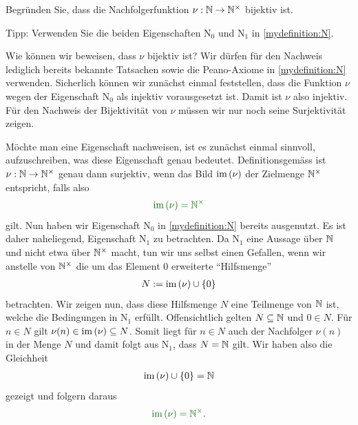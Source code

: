 \begin{mychallenge}\label{mychallenge:0107}
	Begründen Sie, dass die Nachfolgerfunktion $\nu:\mathbb{N}\to\mathbb{N}^{\times}$ bijektiv ist.

	\noindent
	Tipp: Verwenden Sie die beiden Eigenschaften N$_0$ und N$_1$ in \cref{mydefinition:N}.
	\begin{myanswer}
		Wie können wir beweisen, dass $\nu$ bijektiv ist?
		Wir dürfen für den Nachweis lediglich bereits bekannte Tatsachen sowie die Peano-Axiome in \cref{mydefinition:N} verwenden.
		Sicherlich können wir zunächst einmal feststellen, dass die Funktion $\nu$ wegen der Eigenschaft N$_0$ als injektiv vorausgesetzt ist.
		Damit ist $\nu$ also injektiv. Für den Nachweis der Bijektivität von $\nu$ müssen wir nur noch seine Surjektivität zeigen.

		Möchte man eine Eigenschaft nachweisen, ist es zunächst einmal sinnvoll, aufzuschreiben, was diese Eigenschaft genau bedeutet.
		Definitionsgemäss ist $\nu:\mathbb{N}\to\mathbb{N}^{\times}$ genau dann surjektiv, wenn das Bild $\text{im}\left(\nu\right)$ der Zielmenge $\mathbb{N}^{\times}$ entspricht, falls also
		\begin{align*}
			\textcolor{DarkGreen}{\text{im}\lr{\nu} = \Nunit}
		\end{align*}
		gilt.
		Nun haben wir Eigenschaft N$_0$ in \cref{mydefinition:N} bereits ausgenutzt.
		Es ist daher naheliegend, Eigenschaft N$_1$ zu betrachten.
		Da N$_1$ eine Aussage über $\mathbb{N}$ und nicht etwa über $\mathbb{N}^{\times}$ macht,
		tun wir uns selbst einen Gefallen, wenn wir anstelle von $\mathbb{N}^{\times}$ die um das Element $0$ erweiterte \enquote{Hilfsmenge}
		\begin{align*}
			N := \text{im}\left(\nu\right) \cup \left\{0\right\}
		\end{align*}
		betrachten.
		Wir zeigen nun, dass diese Hilfsmenge $N$ eine Teilmenge von $\mathbb{N}$ ist, welche die Bedingungen in N$_1$ erfüllt.
		Offensichtlich gelten $N\subseteq \mathbb{N}$ und $0\in N$.
		Für $n\in N$ gilt $\nu(n)\in\text{im}\left(\nu\right)\subseteq N$.
		Somit liegt für $n\in N$ auch der Nachfolger $\nu(n)$ in der Menge $N$ und damit folgt aus N$_1$, dass $N = \mathbb{N}$ gilt.
		Wir haben also die Gleichheit
		\begin{align*}
			\text{im}\left(\nu\right) \cup \left\{0\right\} = \mathbb{N}
		\end{align*}
		gezeigt und folgern daraus
		\begin{align*}
			\textcolor{DarkGreen}{\text{im}\lr{\nu} = \Nunit}.
		\end{align*}
	\end{myanswer}
\end{mychallenge}

